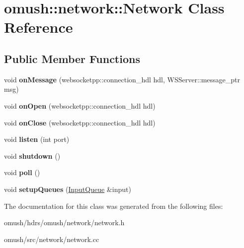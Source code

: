 \hypertarget{classomush_1_1network_1_1_network}{\section{omush\-:\-:network\-:\-:Network Class Reference}
\label{classomush_1_1network_1_1_network}
}
\subsection*{Public Member Functions}
\begin{DoxyCompactItemize}
\item 
\hypertarget{classomush_1_1network_1_1_network_a7a1e785dc22ebfd33f390a6c54b931fb}{void {\bfseries on\-Message} (websocketpp\-::connection\-\_\-hdl hdl, W\-S\-Server\-::message\-\_\-ptr msg)}\label{classomush_1_1network_1_1_network_a7a1e785dc22ebfd33f390a6c54b931fb}

\item 
\hypertarget{classomush_1_1network_1_1_network_ae3abb64cab64eedda8103f851f5f6dab}{void {\bfseries on\-Open} (websocketpp\-::connection\-\_\-hdl hdl)}\label{classomush_1_1network_1_1_network_ae3abb64cab64eedda8103f851f5f6dab}

\item 
\hypertarget{classomush_1_1network_1_1_network_a113f1d170e7e31b9f19ba3af67edf7c4}{void {\bfseries on\-Close} (websocketpp\-::connection\-\_\-hdl hdl)}\label{classomush_1_1network_1_1_network_a113f1d170e7e31b9f19ba3af67edf7c4}

\item 
\hypertarget{classomush_1_1network_1_1_network_a0841d11c94478ce8da836d6be431259b}{void {\bfseries listen} (int port)}\label{classomush_1_1network_1_1_network_a0841d11c94478ce8da836d6be431259b}

\item 
\hypertarget{classomush_1_1network_1_1_network_a7b5c74cd12d86688b485411d1de5900f}{void {\bfseries shutdown} ()}\label{classomush_1_1network_1_1_network_a7b5c74cd12d86688b485411d1de5900f}

\item 
\hypertarget{classomush_1_1network_1_1_network_a49de701c965074f3332773b3c846b239}{void {\bfseries poll} ()}\label{classomush_1_1network_1_1_network_a49de701c965074f3332773b3c846b239}

\item 
\hypertarget{classomush_1_1network_1_1_network_a582373a20ae9c1e3b7c318863b926eb9}{void {\bfseries setup\-Queues} (\hyperlink{classomush_1_1network_1_1_input_queue}{Input\-Queue} \&input)}\label{classomush_1_1network_1_1_network_a582373a20ae9c1e3b7c318863b926eb9}

\end{DoxyCompactItemize}


The documentation for this class was generated from the following files\-:\begin{DoxyCompactItemize}
\item 
omush/hdrs/omush/network/network.\-h\item 
omush/src/network/network.\-cc\end{DoxyCompactItemize}
